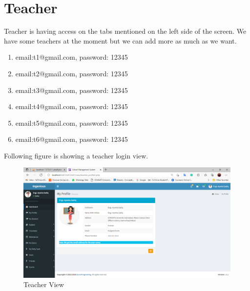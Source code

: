 \section{Teacher}
Teacher is having access on the tabs mentioned on the left side of the screen.
We have some teachers at the moment but we can add more as much as we want.
\begin{enumerate}
\item email:t1@gmail.com, password: 12345
\item email:t2@gmail.com, password: 12345
\item email:t3@gmail.com, password: 12345
\item email:t4@gmail.com, password: 12345
\item email:t5@gmail.com, password: 12345
\item email:t6@gmail.com, password: 12345
\end{enumerate}
Following figure is showing a teacher login view.
\begin{figure}[H]  %
\begin{center}
\includegraphics[scale=0.45]{Chapter4/teacher}
\caption{Teacher View}
\label{teacher}
\end{center}
\end{figure}
